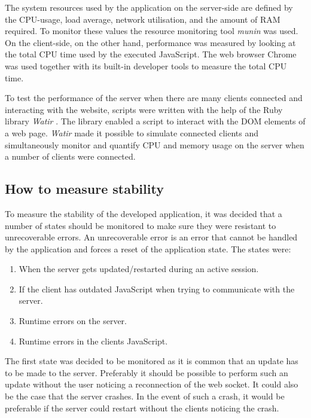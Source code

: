 \documentclass[a4paper]{article}
\begin{document}
The system resources used by the application on the server-side are defined by the CPU-usage, load average, network utilisation, and the amount of RAM required. To monitor these values the resource monitoring tool \textit{munin} \cite{munin-website} was used. On the client-side, on the other hand, performance was measured by looking at the total CPU time used by the executed JavaScript. The web browser Chrome was used together with its built-in developer tools to measure the total CPU time.

To test the performance of the server when there are many clients connected and interacting with the website, scripts were written with the help of the Ruby library \textit{Watir} \cite{watir-test-framework}. The library enabled a script to interact with the DOM elements of a web page. \textit{Watir} made it possible to simulate connected clients and simultaneously monitor and quantify CPU and memory usage on the server when a number of clients were connected.

\subsection{How to measure stability}
\label{sub:method-stability}
To measure the stability of the developed application, it was decided that a number of states should be monitored to make sure they were resistant to unrecoverable errors. An unrecoverable error is an error that cannot be handled by the application and forces a reset of the application state. The states were: 
\begin{enumerate}[noitemsep]
    \item When the server gets updated/restarted during an active session.
    \item If the client has outdated JavaScript when trying to communicate with the server.
    \item Runtime errors on the server.
    \item Runtime errors in the clients JavaScript.\\
\end{enumerate}

The first state was decided to be monitored as it is common that an update has to be made to the server. Preferably it should be possible to perform such an update without the user noticing a reconnection of the web socket. It could also be the case that the server crashes. In the event of such a crash, it would be preferable if the server could restart without the clients noticing the crash.
\end{document}
